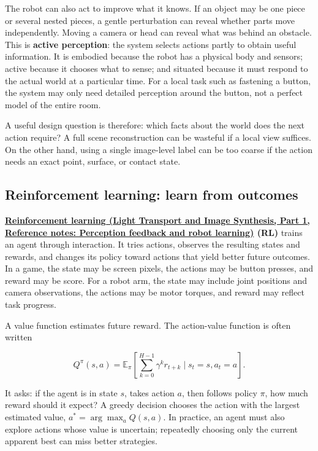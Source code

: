 The robot can also act to improve what it knows. If an object may be one piece or several nested pieces, a gentle perturbation can reveal whether parts move independently. Moving a camera or head can reveal what was behind an obstacle. This is \textbf{active perception}: the system selects actions partly to obtain useful information. It is embodied because the robot has a physical body and sensors; active because it chooses what to sense; and situated because it must respond to the actual world at a particular time. For a local task such as fastening a button, the system may only need detailed perception around the button, not a perfect model of the entire room.

A useful design question is therefore: which facts about the world does the next action require? A full scene reconstruction can be wasteful if a local view suffices. On the other hand, using a single image-level label can be too coarse if the action needs an exact point, surface, or contact state.

\subsection{Reinforcement learning: learn from outcomes}\label{04-visual-computing-ii-ch034-reinforcement-learning-learn-from-outcomes}

\hypertarget{04-visual-computing-ii-ch034-reinforcement-learning-learn-from-outcomes}{}

\textbf{\href{../04-Light-Transport-and-Image-Synthesis-P01/main.pdf\#appendix-b0c42da325f1}{Reinforcement learning (Light Transport and Image Synthesis, Part 1, Reference notes: Perception feedback and robot learning)} (RL)} trains an agent through interaction. It tries actions, observes the resulting states and rewards, and changes its policy toward actions that yield better future outcomes. In a game, the state may be screen pixels, the actions may be button presses, and reward may be score. For a robot arm, the state may include joint positions and camera observations, the actions may be motor torques, and reward may reflect task progress.

A value function estimates future reward. The action-value function is often written

\[
Q^\pi(s,a)=\mathbb{E}_{\pi}\left[\sum_{k=0}^{H-1}\gamma^k r_{t+k}\mid s_t=s,a_t=a\right].
\]

It asks: if the agent is in state \(s\), takes action \(a\), then follows policy \(\pi\), how much reward should it expect? A greedy decision chooses the action with the largest estimated value, \(a^*=\arg\max_a Q(s,a)\). In practice, an agent must also explore actions whose value is uncertain; repeatedly choosing only the current apparent best can miss better strategies.

